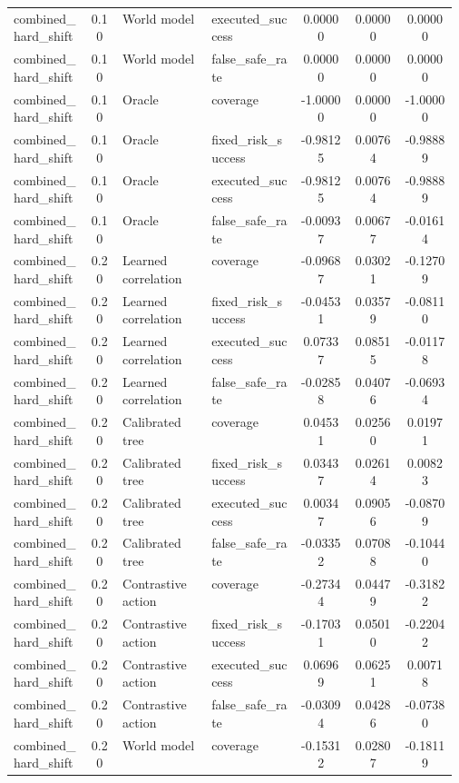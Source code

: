 \documentclass{article}
\begin{document}
\begin{center}
\begin{longtable}{p{0.17\linewidth}cp{0.20\linewidth}p{0.20\linewidth}ccc}
combined\_hard\_shift & 0.10 & World model & executed\_success & 0.00000 & 0.00000 & 0.00000\\
combined\_hard\_shift & 0.10 & World model & false\_safe\_rate & 0.00000 & 0.00000 & 0.00000\\
combined\_hard\_shift & 0.10 & Oracle & coverage & -1.00000 & 0.00000 & -1.00000\\
combined\_hard\_shift & 0.10 & Oracle & fixed\_risk\_success & -0.98125 & 0.00764 & -0.98889\\
combined\_hard\_shift & 0.10 & Oracle & executed\_success & -0.98125 & 0.00764 & -0.98889\\
combined\_hard\_shift & 0.10 & Oracle & false\_safe\_rate & -0.00937 & 0.00677 & -0.01614\\
combined\_hard\_shift & 0.20 & Learned correlation & coverage & -0.09687 & 0.03021 & -0.12709\\
combined\_hard\_shift & 0.20 & Learned correlation & fixed\_risk\_success & -0.04531 & 0.03579 & -0.08110\\
combined\_hard\_shift & 0.20 & Learned correlation & executed\_success & 0.07337 & 0.08515 & -0.01178\\
combined\_hard\_shift & 0.20 & Learned correlation & false\_safe\_rate & -0.02858 & 0.04076 & -0.06934\\
combined\_hard\_shift & 0.20 & Calibrated tree & coverage & 0.04531 & 0.02560 & 0.01971\\
combined\_hard\_shift & 0.20 & Calibrated tree & fixed\_risk\_success & 0.03437 & 0.02614 & 0.00823\\
combined\_hard\_shift & 0.20 & Calibrated tree & executed\_success & 0.00347 & 0.09056 & -0.08709\\
combined\_hard\_shift & 0.20 & Calibrated tree & false\_safe\_rate & -0.03352 & 0.07088 & -0.10440\\
combined\_hard\_shift & 0.20 & Contrastive action & coverage & -0.27344 & 0.04479 & -0.31822\\
combined\_hard\_shift & 0.20 & Contrastive action & fixed\_risk\_success & -0.17031 & 0.05010 & -0.22042\\
combined\_hard\_shift & 0.20 & Contrastive action & executed\_success & 0.06969 & 0.06251 & 0.00718\\
combined\_hard\_shift & 0.20 & Contrastive action & false\_safe\_rate & -0.03094 & 0.04286 & -0.07380\\
combined\_hard\_shift & 0.20 & World model & coverage & -0.15312 & 0.02807 & -0.18119\\

\end{longtable}
\end{center}
\end{document}
